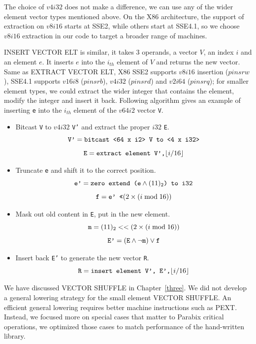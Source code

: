 The choice of $v4i32$ does not make a difference, we can use any of the wider element vector types mentioned above. On the X86 architecture, the support of extraction on $v8i16$ starts at SSE2, while others start at SSE4.1, so we choose $v8i16$ extraction in our code to target a broader range of machines.

INSERT VECTOR ELT is similar, it takes 3 operands, a vector $V$, an index $i$ and an element $e$. It inserts $e$ into the $i_{th}$ element of $V$ and returns the new vector. Same as EXTRACT VECTOR ELT, X86 SSE2 supports $v8i16$ insertion ($pinsrw$), SSE4.1 supports $v16i8$ ($pinsrb$), $v4i32$ ($pinsrd$) and $v2i64$ ($pinsrq$); for smaller element types, we could extract the wider integer that contains the element, modify the integer and insert it back. Following algorithm gives an example of inserting {\tt e} into the $i_{th}$ element of the $v64i2$ vector {\tt V}.

\begin{itemize}
  \item Bitcast {\tt V} to $v4i32$ {\tt V'} and extract the proper $i32$ {\tt E}.
  \[\text{\tt V'} = \text{\tt bitcast <64 x i2> V to <4 x i32>} \]
  \[\text{\tt E} = \text{\tt extract element V',} \lfloor i / 16 \rfloor \]

  \item Truncate {\tt e} and shift it to the correct position.
  \[\text{\tt e'} = \text{\tt zero extend (e} \land (11)_2 \text{\tt ) to i32} \]
  \[\text{\tt f} = \text{\tt e' <<} (2 \times (i \bmod 16))\]

  \item Mask out old content in {\tt E}, put in the new element.
  \[\text{\tt m} = (11)_2 << (2 \times (i \bmod 16)) \]
  \[\text{\tt E'} = (\text{\tt E} \land \lnot \text{\tt m}) \lor \text{\tt f}\]

  \item Insert back {\tt E'} to generate the new vector {\tt R}.
  \[\text{\tt R} = \text{\tt insert element V', E',} \lfloor i / 16 \rfloor \]
\end{itemize}

We have discussed VECTOR SHUFFLE in Chapter~\ref{three}. We did not develop a general lowering strategy for the small element VECTOR SHUFFLE\@. An efficient general lowering requires better machine instructions such as PEXT\@. Instead, we focused more on special cases that matter to Parabix critical operations, we optimized those cases to match performance of the hand-written library.

